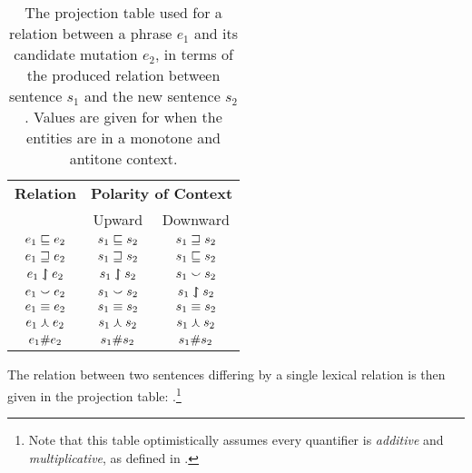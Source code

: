 \begin{table}[t]
	\begin{center}
	\begin{tabular}{c|cc}
    \textbf{Relation} & \multicolumn{2}{|c}{\textbf{Polarity of Context}} \\
             & Upward & Downward \\
    \hline
    $e_1 \sqsubseteq     e_2$ & $s_1 \sqsubseteq     s_2$ & $s_1 \sqsupseteq     s_2$ \\ 
    $e_1 \sqsupseteq     e_2$ & $s_1 \sqsupseteq     s_2$ & $s_1 \sqsubseteq     s_2$ \\ 
    $e_1 \downharpoonleft\hspace{-1.25mm}\upharpoonright   e_2$ & $s_1 \downharpoonleft\hspace{-1.25mm}\upharpoonright   s_2$ & $s_1 \smallsmile       s_2$ \\ 
    $e_1 \smallsmile       e_2$ & $s_1 \smallsmile       s_2$ & $s_1 \downharpoonleft\hspace{-1.25mm}\upharpoonright   s_2$ \\ 
    $e_1 \equiv  e_2$ & $s_1 \equiv  s_2$ & $s_1 \equiv  s_2$ \\ 
    $e_1 \curlywedge      e_2$ & $s_1 \curlywedge      s_2$ & $s_1 \curlywedge      s_2$ \\ 
    $e_1 \# e_2$ & $s_1 \# s_2$ & $s_1 \# s_2$
	\end{tabular}
	\caption{
    The projection table used for a relation between a phrase $e_1$ and
      its candidate mutation $e_2$, in terms of the produced relation
      between sentence $s_1$ and the new sentence $s_2$.
    Values are given for when the entities are in a monotone and
      antitone context.
		\label{tab:projectivity}
	}
	\end{center}
\end{table}

The relation between two sentences differing by a single lexical
  relation is then given in the projection table:
  .\footnote{
    Note that this table optimistically assumes every quantifier is
    \textit{additive} and \textit{multiplicative}, as defined
    in .
  }



